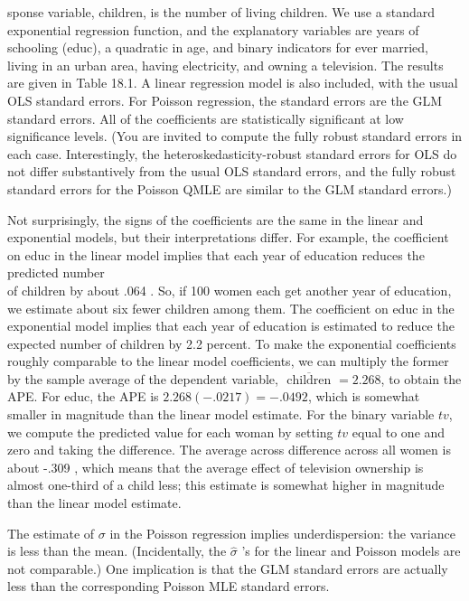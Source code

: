 \documentclass[10pt]{article}
\begin{document}
sponse variable, children, is the number of living children. We use a standard exponential regression function, and the explanatory variables are years of schooling (educ), a quadratic in age, and binary indicators for ever married, living in an urban area, having electricity, and owning a television. The results are given in Table 18.1. A linear regression model is also included, with the usual OLS standard errors. For Poisson regression, the standard errors are the GLM standard errors. All of the coefficients are statistically significant at low significance levels. (You are invited to compute the fully robust standard errors in each case. Interestingly, the heteroskedasticity-robust standard errors for OLS do not differ substantively from the usual OLS standard errors, and the fully robust standard errors for the Poisson QMLE are similar to the GLM standard errors.)

Not surprisingly, the signs of the coefficients are the same in the linear and exponential models, but their interpretations differ. For example, the coefficient on educ in the linear model implies that each year of education reduces the predicted number\\
of children by about .064 . So, if 100 women each get another year of education, we estimate about six fewer children among them. The coefficient on educ in the exponential model implies that each year of education is estimated to reduce the expected number of children by 2.2 percent. To make the exponential coefficients roughly comparable to the linear model coefficients, we can multiply the former by the sample average of the dependent variable, $\overline{\text { children }}=2.268$, to obtain the APE. For educ, the APE is $2.268(-.0217)=-.0492$, which is somewhat smaller in magnitude than the linear model estimate. For the binary variable $t v$, we compute the predicted value for each woman by setting $t v$ equal to one and zero and taking the difference. The average across difference across all women is about -.309 , which means that the average effect of television ownership is almost one-third of a child less; this estimate is somewhat higher in magnitude than the linear model estimate.

The estimate of $\sigma$ in the Poisson regression implies underdispersion: the variance is less than the mean. (Incidentally, the $\hat{\sigma}$ 's for the linear and Poisson models are not comparable.) One implication is that the GLM standard errors are actually less than the corresponding Poisson MLE standard errors.
\end{document}
